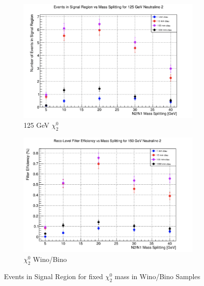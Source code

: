 \documentclass{article}
\begin{document}
\begin{figure} [H]
\begin{subfigure}{.5\textwidth}
  \centering
  \includegraphics[width=.8\linewidth]{125GeVWino.png}  
  \caption{125 GeV $\chi_{2}^{0}$}
  \label{fig:sub-first19}
\end{subfigure}
\begin{subfigure}{.5\textwidth}
  \centering
  \includegraphics[width=.8\linewidth]{150GeVWino.png}  
  \caption{$\chi_{2}^{0}$ Wino/Bino}
  \label{fig:sub-second19}
\end{subfigure}
\caption{Events in Signal Region for fixed $\chi_{2}^{0}$ mass in Wino/Bino Samples}
\label{fig:21}
\end{figure}
\end{document}
